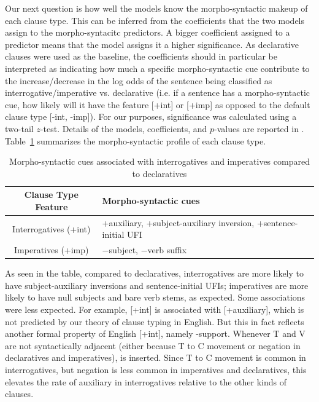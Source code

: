 
Our next question is how well the models know the morpho-syntactic makeup of each clause type. This can be inferred from the coefficients that the two models assign to the morpho-syntacitc predictors. A bigger coefficient assigned to a predictor means that the model assigns it a higher significance. As declarative clauses were used as the baseline, the coefficients should in particular be interpreted as indicating how much a specific morpho-syntactic cue contribute to the increase/decrease in the log odds of the sentence being classified as interrogative/imperative vs. declarative (i.e. if a sentence has a morpho-syntactic cue, how likely will it have the feature [+int] or [+imp] as opposed to the default clause type [-int, -imp]). For our purposes, significance was calculated using a two-tail $z$-test. Details of the models, coefficients, and $p$-values are reported in \mycode{}. %
Table~\ref{tab:engcl:corpus:formal} summarizes the morpho-syntactic profile of each clause type.

\begin{table}[H]
\begin{center}
\begin{tabular}{c|p{10cm}}
\hline
Clause Type Feature & Morpho-syntactic cues\\
\hline \hline
Interrogatives (+int) & +auxiliary, +subject-auxiliary inversion, +sentence-initial UFI\\
\hline
Imperatives (+imp) & $-$subject, $-$verb suffix\\
\hline \hline
\end{tabular}
\end{center}
\caption{Morpho-syntactic cues associated with interrogatives and imperatives compared to declaratives}
\label{tab:engcl:corpus:formal}
\end{table}%


As seen in the table, compared to declaratives, interrogatives are more likely to have subject-auxiliary inversions and sentence-initial UFIs; imperatives are more likely to have null subjects and bare verb stems, as expected. Some associations were less expected. For example, [+int] is associated with [+auxiliary], which is not predicted by our theory of clause typing in English. But this in fact reflects another formal property of English [+int], namely -support. Whenever T and V are not syntactically adjacent (either because T to C movement or negation in declaratives and imperatives),  is inserted. Since T to C movement is common in interrogatives, but negation is less common in imperatives and declaratives, this elevates the rate of auxiliary in interrogatives relative to the other kinds of clauses. %

